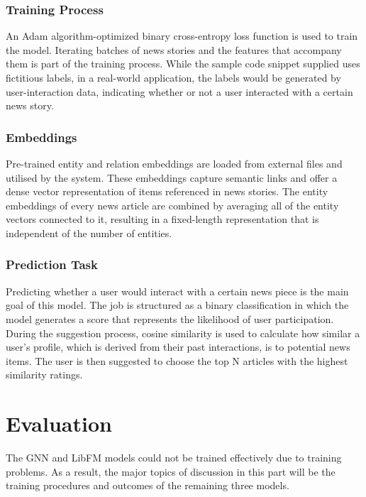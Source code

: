 \documentclass[9pt,twocolumn,twoside,lineno]{gsajnl}
\begin{document}
\subsubsection{Training Process\newline}
An Adam algorithm-optimized binary cross-entropy loss function is used to train the model. Iterating batches of news stories and the features that accompany them is part of the training process. While the sample code snippet supplied uses fictitious labels, in a real-world application, the labels would be generated by user-interaction data, indicating whether or not a user interacted with a certain news story.

\subsubsection{Embeddings\newline}
Pre-trained entity and relation embeddings are loaded from external files and utilised by the system. These embeddings capture semantic links and offer a dense vector representation of items referenced in news stories. The entity embeddings of every news article are combined by averaging all of the entity vectors connected to it, resulting in a fixed-length representation that is independent of the number of entities.

\subsubsection{Prediction Task\newline}
Predicting whether a user would interact with a certain news piece is the main goal of this model. The job is structured as a binary classification in which the model generates a score that represents the likelihood of user participation. During the suggestion process, cosine similarity is used to calculate how similar a user's profile, which is derived from their past interactions, is to potential news items. The user is then suggested to choose the top N articles with the highest similarity ratings.

\section{Evaluation}
The GNN and LibFM models could not be trained effectively due to training problems. As a result, the major topics of discussion in this part will be the training procedures and outcomes of the remaining three models.
\end{document}
